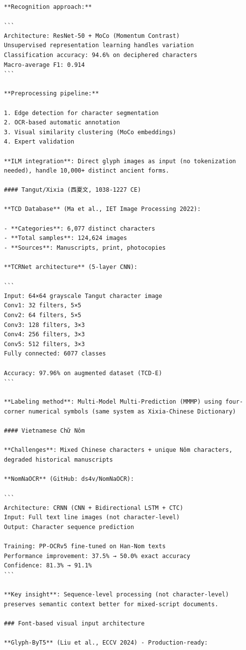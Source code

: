\documentclass[11pt]{article}
\begin{document}
\begin{verbatim}
**Recognition approach:**

```
Architecture: ResNet-50 + MoCo (Momentum Contrast)
Unsupervised representation learning handles variation
Classification accuracy: 94.6% on deciphered characters
Macro-average F1: 0.914
```

**Preprocessing pipeline:**

1. Edge detection for character segmentation
2. OCR-based automatic annotation
3. Visual similarity clustering (MoCo embeddings)
4. Expert validation

**ILM integration**: Direct glyph images as input (no tokenization needed), handle 10,000+ distinct ancient forms.

#### Tangut/Xixia (西夏文, 1038-1227 CE)

**TCD Database** (Ma et al., IET Image Processing 2022):

- **Categories**: 6,077 distinct characters
- **Total samples**: 124,624 images
- **Sources**: Manuscripts, print, photocopies

**TCRNet architecture** (5-layer CNN):

```
Input: 64×64 grayscale Tangut character image
Conv1: 32 filters, 5×5
Conv2: 64 filters, 5×5  
Conv3: 128 filters, 3×3
Conv4: 256 filters, 3×3
Conv5: 512 filters, 3×3
Fully connected: 6077 classes

Accuracy: 97.96% on augmented dataset (TCD-E)
```

**Labeling method**: Multi-Model Multi-Prediction (MMMP) using four-corner numerical symbols (same system as Xixia-Chinese Dictionary)

#### Vietnamese Chữ Nôm

**Challenges**: Mixed Chinese characters + unique Nôm characters, degraded historical manuscripts

**NomNaOCR** (GitHub: ds4v/NomNaOCR):

```
Architecture: CRNN (CNN + Bidirectional LSTM + CTC)
Input: Full text line images (not character-level)
Output: Character sequence prediction

Training: PP-OCRv5 fine-tuned on Han-Nom texts
Performance improvement: 37.5% → 50.0% exact accuracy
Confidence: 81.3% → 91.1%
```

**Key insight**: Sequence-level processing (not character-level) preserves semantic context better for mixed-script documents.

### Font-based visual input architecture

**Glyph-ByT5** (Liu et al., ECCV 2024) - Production-ready:


\end{verbatim}
\end{document}
